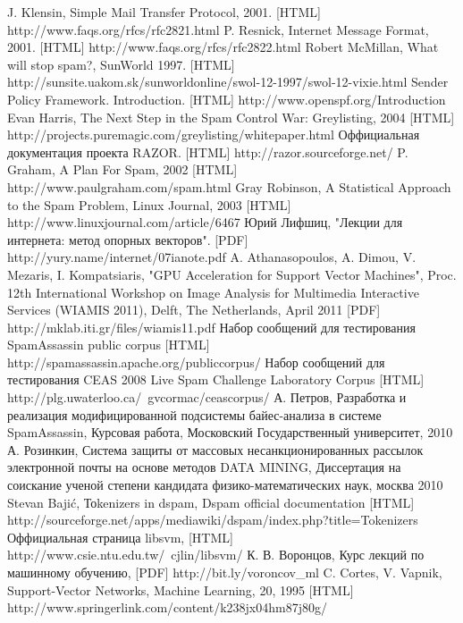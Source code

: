 \newpage
\begin{thebibliography}{99}
 J. Klensin, Simple Mail Transfer Protocol, 2001. [HTML] http://www.faqs.org/rfcs/rfc2821.html 
 P. Resnick, Internet Message Format, 2001. [HTML] http://www.faqs.org/rfcs/rfc2822.html
 Robert McMillan, What will stop spam?, SunWorld 1997. [HTML] http://sunsite.uakom.sk/sunworldonline/swol-12-1997/swol-12-vixie.html
 Sender Policy Framework. Introduction.  [HTML] http://www.openspf.org/Introduction
 Evan Harris, The Next Step in the Spam Control War: Greylisting, 2004 [HTML] http://projects.puremagic.com/greylisting/whitepaper.html
 Оффициальная документация проекта RAZOR. [HTML] http://razor.sourceforge.net/
 P. Graham, A Plan For Spam, 2002 [HTML] http://www.paulgraham.com/spam.html
 Gray Robinson, A Statistical Approach to the Spam Problem, Linux Journal, 2003 [HTML] http://www.linuxjournal.com/article/6467 
 Юрий Лифшиц, "Лекции для интернета: метод опорных векторов". [PDF] http://yury.name/internet/07ianote.pdf
A. Athanasopoulos, A. Dimou, V. Mezaris, I. Kompatsiaris, "GPU Acceleration for Support Vector Machines", Proc. 12th International Workshop on Image Analysis for Multimedia Interactive Services (WIAMIS 2011), Delft, The Netherlands, April 2011 [PDF] http://mklab.iti.gr/files/wiamis11.pdf
 Набор сообщений для тестирования SpamAssassin public corpus [HTML] http://spamassassin.apache.org/publiccorpus/
 Набор сообщений для тестирования CEAS 2008 Live Spam Challenge Laboratory Corpus [HTML] http://plg.uwaterloo.ca/~gvcormac/ceascorpus/
 А. Петров, Разработка и реализация модифицированной подсистемы байес-анализа в системе SpamAssassin, Курсовая работа, Московский Государственный университет, 2010
 А. Розинкин, Система защиты от массовых несанкционированных рассылок электронной почты на основе методов DATA MINING, Диссертация на соискание ученой степени кандидата физико-математических наук, москва 2010 
 Stevan Bajić, Тоkenizers in dspam, Dspam official documentation [HTML] http://sourceforge.net/apps/mediawiki/dspam/index.php?title=Tokenizers
Оффициальная страница libsvm, [HTML] http://www.csie.ntu.edu.tw/~cjlin/libsvm/
 К. В. Воронцов, Курс лекций по машинному обучению, [PDF] http://bit.ly/voroncov\_ml 
 C. Cortes, V. Vapnik, Support-Vector Networks, Machine Learning, 20, 1995 [HTML] http://www.springerlink.com/content/k238jx04hm87j80g/
\end{thebibliography}
